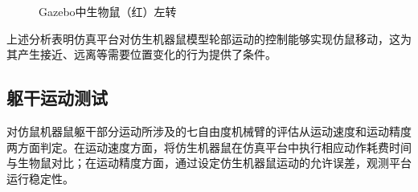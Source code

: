 \begin{figure}[htb]
{  }
  \caption{Gazebo中生物鼠（红）左转}\label{figure_simturn}
\end{figure}

上述分析表明仿真平台对仿生机器鼠模型轮部运动的控制能够实现仿鼠移动，这为其产生接近、远离等需要位置变化的行为提供了条件。
\subsection{躯干运动测试}
对仿鼠机器鼠躯干部分运动所涉及的七自由度机械臂的评估从运动速度和运动精度两方面判定。在运动速度方面，将仿生机器鼠在仿真平台中执行相应动作耗费时间与生物鼠对比；在运动精度方面，通过设定仿生机器鼠运动的允许误差，观测平台运行稳定性。

